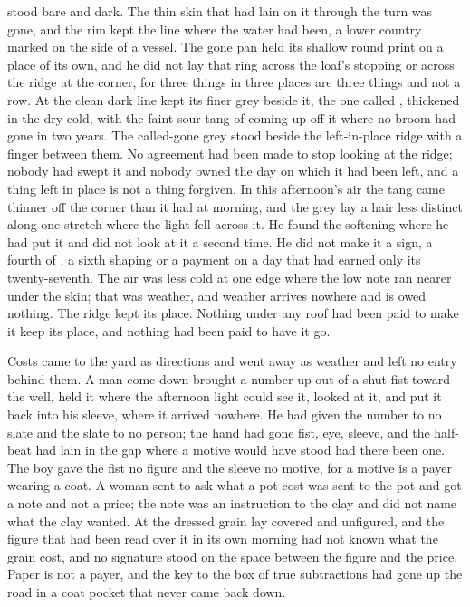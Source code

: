  stood bare and dark. The thin skin that had lain on it through the turn was gone, and the rim kept the line where the water had been, a lower country marked on the side of a vessel. The gone pan held its shallow round print on a place of its own, and he did not lay that ring across the loaf's stopping or across the ridge at the corner, for three things in three places are three things and not a row. At  the clean dark line kept its finer grey beside it, the one called , thickened in the dry cold, with the faint sour tang of  coming up off it where no broom had gone in two years. The called-gone grey stood beside the left-in-place ridge with a finger between them. No agreement had been made to stop looking at the ridge; nobody had swept it and nobody owned the day on which it had been left, and a thing left in place is not a thing forgiven. In this afternoon's air the tang came thinner off the corner than it had at morning, and the grey lay a hair less distinct along one stretch where the light fell across it. He found the softening where he had put it and did not look at it a second time. He did not make it a sign, a fourth of , a sixth shaping or a payment on a day that had earned only its twenty-seventh. The air was less cold at one edge where the low note ran nearer under the skin; that was weather, and weather arrives nowhere and is owed nothing. The ridge kept its place. Nothing under any roof had been paid to make it keep its place, and nothing had been paid to have it go.

Costs came to the yard as directions and went away as weather and left no entry behind them. A man come down  brought a number up out of a shut fist toward the well, held it where the afternoon light could see it, looked at it, and put it back into his sleeve, where it arrived nowhere. He had given the number to no slate and the slate to no person; the hand had gone fist, eye, sleeve, and the half-beat had lain in the gap where a motive would have stood had there been one. The boy gave the fist no figure and the sleeve no motive, for a motive is a payer wearing a coat. A woman sent to ask what a pot cost was sent to the pot and got a note and not a price; the note was an instruction to the clay and did not name what the clay wanted. At  the dressed grain lay covered and unfigured, and the figure that had been read over it in its own morning had not known what the grain cost, and no signature stood on the space between the figure and the price. Paper is not a payer, and the key to the box of true subtractions had gone up the road in a coat pocket that never came back down.

